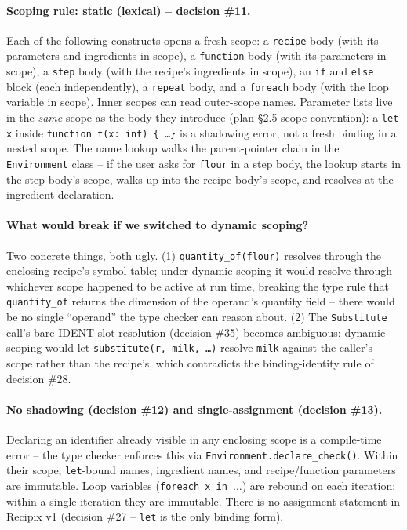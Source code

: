 \documentclass[11pt,a4paper]{article}
\begin{document}
\paragraph{Scoping rule: static (lexical) -- decision \#11.}
Each of the following constructs opens a fresh scope: a \texttt{recipe}
body (with its parameters and ingredients in scope), a \texttt{function}
body (with its parameters in scope), a \texttt{step} body (with the
recipe's ingredients in scope), an \texttt{if} and \texttt{else} block
(each independently), a \texttt{repeat} body, and a \texttt{foreach}
body (with the loop variable in scope). Inner scopes can read
outer-scope names. Parameter lists live in the \emph{same} scope as the
body they introduce (plan \S2.5 scope convention): a \texttt{let x}
inside \texttt{function f(x: int) \{ \dots \}} is a shadowing error,
not a fresh binding in a nested scope. The name lookup walks the
parent-pointer chain in the \texttt{Environment} class -- if the user
asks for \texttt{flour} in a step body, the lookup starts in the step
body's scope, walks up into the recipe body's scope, and resolves at the
ingredient declaration.

\paragraph{What would break if we switched to dynamic scoping?}
Two concrete things, both ugly. (1) \texttt{quantity\_of(flour)} resolves
through the enclosing recipe's symbol table; under dynamic scoping it
would resolve through whichever scope happened to be active at run
time, breaking the type rule that \texttt{quantity\_of} returns the
dimension of the operand's quantity field -- there would be no single
``operand'' the type checker can reason about. (2) The
\texttt{Substitute} call's bare-IDENT slot resolution (decision \#35)
becomes ambiguous: dynamic scoping would let \texttt{substitute(r, milk,
\dots)} resolve \texttt{milk} against the caller's scope rather than
the recipe's, which contradicts the binding-identity rule of decision
\#28.

\paragraph{No shadowing (decision \#12) and single-assignment
(decision \#13).} Declaring an identifier already visible in any
enclosing scope is a compile-time error -- the type checker enforces
this via \texttt{Environment.declare\_check()}. Within their scope,
\texttt{let}-bound names, ingredient names, and recipe/function
parameters are immutable. Loop variables (\texttt{foreach x in $\dots$})
are rebound on each iteration; within a single iteration they are
immutable. There is no assignment statement in Recipix v1 (decision
\#27 -- \texttt{let} is the only binding form).
\end{document}
